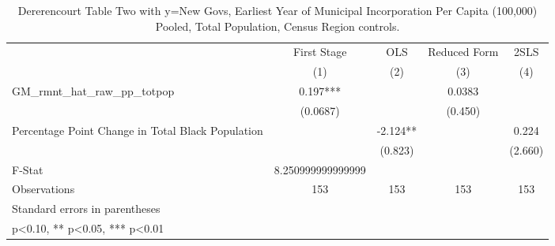 \begin{table}[htbp]\centering
\def\sym#1{\ifmmode^{#1}\else\(^{#1}\)\fi}
\caption{Dererencourt Table Two with y=New Govs, Earliest Year of Municipal Incorporation Per Capita (100,000) Pooled, Total Population, Census Region controls.}
\begin{tabular}{l*{4}{c}}
\toprule
                    & First Stage   &         OLS   &Reduced Form   &        2SLS   \\
                    &\multicolumn{1}{c}{(1)}   &\multicolumn{1}{c}{(2)}   &\multicolumn{1}{c}{(3)}   &\multicolumn{1}{c}{(4)}   \\
\midrule
GM\_rmnt\_hat\_raw\_pp\_totpop&       0.197***&               &      0.0383   &               \\
                    &    (0.0687)   &               &     (0.450)   &               \\
\addlinespace
Percentage Point Change in Total Black Population&               &      -2.124** &               &       0.224   \\
                    &               &     (0.823)   &               &     (2.660)   \\
\midrule
F-Stat              &8.250999999999999   &               &               &               \\
Observations        &         153   &         153   &         153   &         153   \\
\bottomrule
\multicolumn{5}{l}{\footnotesize Standard errors in parentheses}\\
\multicolumn{5}{l}{\footnotesize * p<0.10, ** p<0.05, *** p<0.01}\\
\end{tabular}
\end{table}
